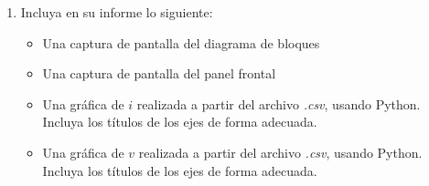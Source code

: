 \begin{enumerate}
\item Incluya en su informe lo siguiente:
    \begin{itemize}
        \item Una captura de pantalla del diagrama de bloques
        \item Una captura de pantalla del panel frontal
        \item Una gráfica de $i$ realizada a partir del archivo \emph{.csv}, usando Python. Incluya los títulos de los ejes de forma adecuada. 
        \item Una gráfica de $v$ realizada a partir del archivo \emph{.csv}, usando Python. Incluya los títulos de los ejes de forma adecuada. 
    \end{itemize}
\end{enumerate}